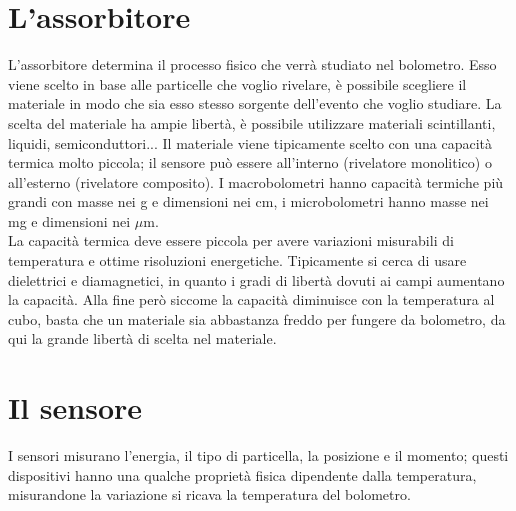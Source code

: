 \section{L'assorbitore}
L'assorbitore determina il processo fisico che verr\`a studiato nel bolometro.
Esso viene scelto in base alle particelle che voglio rivelare, \`e possibile scegliere il materiale in modo che sia esso stesso sorgente dell'evento che
voglio studiare. 
La scelta del materiale ha ampie libert\`a, \`e possibile utilizzare materiali scintillanti, liquidi, semiconduttori...
Il materiale viene tipicamente scelto con una capacit\`a termica molto piccola; il sensore pu\`o essere all'interno (rivelatore monolitico)
o all'esterno (rivelatore composito).
I macrobolometri hanno capacit\`a termiche pi\`u grandi con masse nei g e dimensioni nei cm, i microbolometri hanno masse nei mg e dimensioni nei
$\mu$m.\\
La capacit\`a termica deve essere piccola per avere variazioni misurabili di temperatura e ottime risoluzioni energetiche.
Tipicamente si cerca di usare dielettrici e diamagnetici, in quanto i gradi di libert\`a dovuti ai campi aumentano la capacit\`a.
Alla fine per\`o siccome la capacit\`a diminuisce con la temperatura al cubo, basta che un materiale sia abbastanza freddo per fungere da bolometro,
da qui la grande libert\`a di scelta nel materiale.
\section{Il sensore}
I sensori misurano l'energia, il tipo di particella, la posizione e il momento; questi dispositivi hanno una qualche
propriet\`a fisica dipendente dalla temperatura, misurandone la variazione si ricava la temperatura del bolometro.
